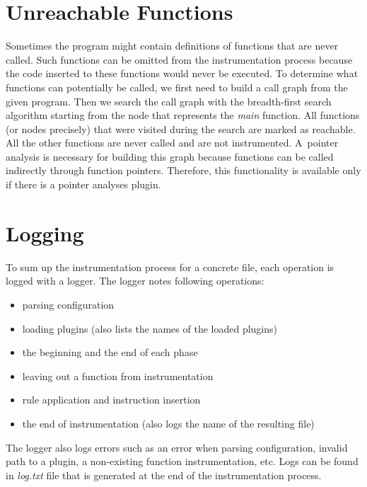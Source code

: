 \section{Unreachable Functions}

Sometimes the program might contain definitions of functions that are never
called. Such functions can be omitted from the instrumentation process because
the code inserted to these functions would never be executed. To determine what
functions can potentially be called, we first need to build a call graph from
the given program. Then we search the call graph with the breadth-first search
algorithm starting from the node that represents the \emph{main} function. All
functions (or nodes precisely) that were visited during the search are marked
as reachable. All the other functions are never called and are not
instrumented. A~pointer analysis is necessary for building this graph because
functions can be called indirectly through function pointers. Therefore, this
functionality is available only if there is a pointer analyses plugin.

\section{Logging}

To sum up the instrumentation process for a concrete file, each operation is
logged with a logger. The logger notes following operations:
\begin{itemize}
  \item parsing configuration
  \item loading plugins (also lists the names of the loaded plugins)
  \item the beginning and the end of each phase
  \item leaving out a function from instrumentation
  \item rule application and instruction insertion
  \item the end of instrumentation (also logs the name of the resulting file)
\end{itemize}
The logger also logs errors such as an error when parsing configuration,
invalid path to a plugin, a non-existing function instrumentation, etc. Logs
can be found in \emph{log.txt} file that is generated at the end of the
instrumentation process.

